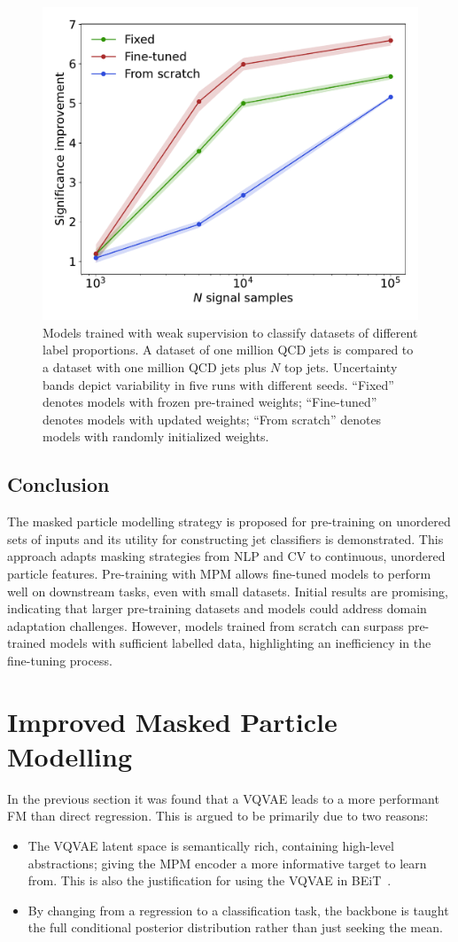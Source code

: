 \begin{figure}[htp!]
    \centering
    \includegraphics[width=0.5\columnwidth]{Figures/foundation_models/mpm1/cwola_40M_0.pdf}
    \caption{
        Models trained with weak supervision to classify datasets of different label proportions.
        A dataset of one million QCD jets is compared to a dataset with one million QCD jets plus $N$ top jets. Uncertainty bands depict variability in five runs with different seeds.
        ``Fixed'' denotes models with frozen pre-trained weights; ``Fine-tuned'' denotes models with updated weights; ``From scratch'' denotes models with randomly initialized weights.}
    \label{fig:lp_ws}
\end{figure}

\subsection{Conclusion}

The masked particle modelling strategy is proposed for pre-training on unordered sets of inputs and its utility for constructing jet classifiers is demonstrated.
This approach adapts masking strategies from NLP and CV to continuous, unordered particle features.
Pre-training with MPM allows fine-tuned models to perform well on downstream tasks, even with small datasets.
Initial results are promising, indicating that larger pre-training datasets and models could address domain adaptation challenges.
However, models trained from scratch can surpass pre-trained models with sufficient labelled data, highlighting an inefficiency in the fine-tuning process.

\section{Improved Masked Particle Modelling}

In the previous section it was found that a VQVAE leads to a more performant FM than direct regression.
This is argued to be primarily due to two reasons:
\begin{itemize}
    \item The VQVAE latent space is semantically rich, containing high-level abstractions; giving the MPM encoder a more informative target to learn from.
          This is also the justification for using the VQVAE in BEiT~\cite{BEIT}.
    \item By changing from a regression to a classification task, the backbone is taught the full conditional posterior distribution rather than just seeking the mean.
\end{itemize}

